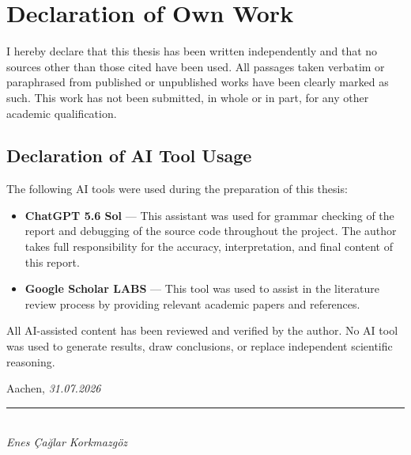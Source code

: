 \ifmasterthesis
\else\ifbachelorthesis
\else

\chapter*{Declaration of Own Work}

I hereby declare that this thesis has been written independently and that no sources other than those cited have been used. All passages taken verbatim or paraphrased from published or unpublished works have been clearly marked as such. This work has not been submitted, in whole or in part, for any other academic qualification.

\fi\fi

\section*{Declaration of AI Tool Usage}

The following AI tools were used during the preparation of this thesis:

\begin{itemize}
  \item \textbf{ChatGPT 5.6 Sol} — This assistant was used for grammar checking of the report and debugging of the source code throughout the project. The author takes full responsibility for the accuracy, interpretation, and final content of this report.
  \item \textbf{Google Scholar LABS} — This tool was used to assist in the literature review process by providing relevant academic papers and references.
\end{itemize}

\noindent
All AI-assisted content has been reviewed and verified by the author. No AI tool was used to generate results, draw conclusions, or replace independent scientific reasoning.

\vspace{2cm}

\noindent
Aachen, \textit{31.07.2026}

\vspace{1.5cm}

\noindent
\rule{0.4\textwidth}{0.4pt}\\
\textit{Enes Çağlar Korkmazgöz}
